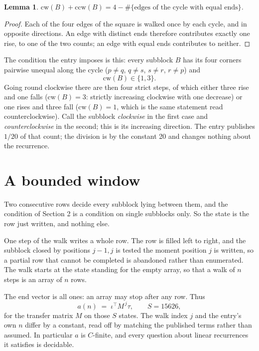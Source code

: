 \documentclass[11pt,a4paper]{article}
\theoremstyle{plain}
\newtheorem{lemma}[theorem]{Lemma}
\theoremstyle{definition}
\begin{document}
\begin{lemma}\label{lem:sum}
$\mathrm{cw}(B)+\mathrm{ccw}(B)=4-\#\{\text{edges of the cycle with equal ends}\}$.
\end{lemma}

\begin{proof}
Each of the four edges of the square is walked once by each cycle, and in opposite directions.
An edge with distinct ends therefore contributes exactly one rise, to one of the two counts;
an edge with equal ends contributes to neither.
\end{proof}

The condition the entry imposes is this: every subblock $B$ has its four corners pairwise unequal along the cycle ($p\ne q$, $q\ne s$, $s\ne r$, $r\ne p$) and
\[
\mathrm{cw}(B)\in\{1,3\}.
\]
Going round clockwise there are then four strict steps, of which either three rise and one falls ($\mathrm{cw}(B)=3$: strictly increasing clockwise with one decrease) or one rises and three fall ($\mathrm{cw}(B)=1$, which is the same statement read counterclockwise). Call the subblock \emph{clockwise} in the first case and \emph{counterclockwise} in the second; this is its increasing direction. The entry publishes $1/20$ of that count; the division is by the constant 20 and changes nothing about the recurrence.

\section{A bounded window}

Two consecutive rows decide every subblock lying between them, and the condition of Section 2 is a condition on single subblocks only. So the state is the row just written, and nothing else.

One step of the walk writes a whole row. The row is filled left to right, and the subblock
closed by positions $j-1,j$ is tested the moment position $j$ is written, so a partial row that
cannot be completed is abandoned rather than enumerated. The walk starts at the state standing
for the empty array, so that a walk of $n$ steps is an array of $n$ rows.

The end vector is all ones: an array may stop after any row. Thus
\[
a(n)\;=\;\iota^{\!\top}M^{\,j}\tau ,\qquad S=15626,
\]
for the transfer matrix $M$ on those $S$ states. The walk index $j$ and the entry's own $n$
differ by a constant, read off by matching the published terms rather than assumed. In
particular $a$ is $C$-finite, and every question about linear recurrences it satisfies is
decidable.
\end{document}
